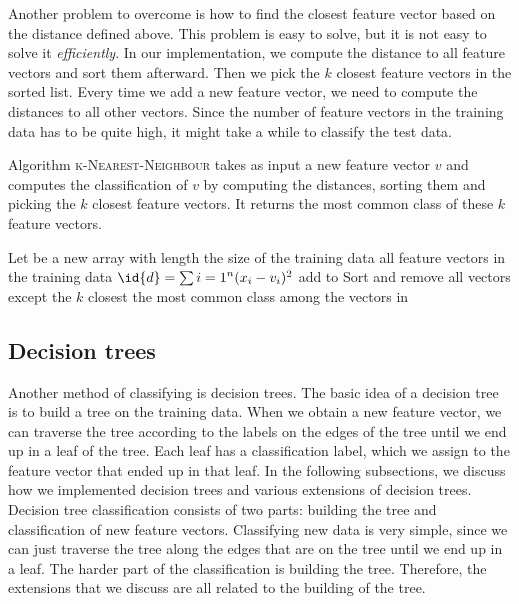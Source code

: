 \documentclass[10pt,a4paper]{article}
\begin{document}
Another problem to overcome is how to find the closest feature vector based on the distance defined above. This problem is easy to solve, but it is not easy to solve it \emph{efficiently}. In our implementation, we compute the distance to all feature vectors and sort them afterward. Then we pick the $k$ closest feature vectors in the sorted list. Every time we add a new feature vector, we need to compute the distances to all other vectors. Since the number of feature vectors in the training data has to be quite high, it might take a while to classify the test data.

Algorithm \textsc{k-Nearest-Neighbour} takes as input a new feature vector $v$ and computes the classification of $v$ by computing the distances, sorting them and picking the $k$ closest feature vectors. It returns the most common class of these $k$ feature vectors.

\begin{codebox}
\li Let  be a new array with length the size of the training data
\li \For all feature vectors  in the training data \Do
\li	$\id{d} = \sum{i=1}^n (x_i - v_i)^2$
\li	add  to 
\End
\li Sort  and remove all vectors except the $k$ closest
\li \Return the most common class among the vectors in 
\end{codebox}
\subsection{Decision trees}
Another method of classifying is decision trees. The basic idea of a decision tree is to build a tree on the training data. When we obtain a new feature vector, we can traverse the tree according to the labels on the edges of the tree until we end up in a leaf of the tree. Each leaf has a classification label, which we assign to the feature vector that ended up in that leaf. In the following subsections, we discuss how we implemented decision trees and various extensions of decision trees. Decision tree classification consists of two parts: building the tree and classification of new feature vectors. Classifying new data is very simple, since we can just traverse the tree along the edges that are on the tree until we end up in a leaf. The harder part of the classification is building the tree. Therefore, the extensions that we discuss are all related to the building of the tree.
\end{document}
